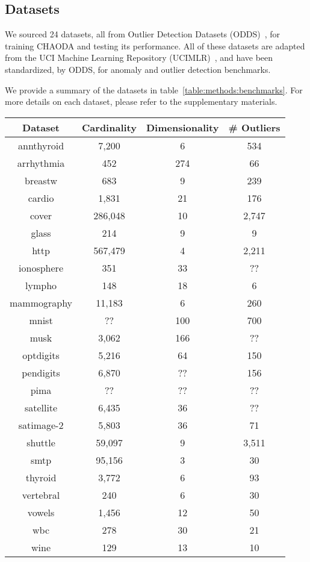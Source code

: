 \subsection{Datasets}\label{subsec:methods:datasets}

We sourced 24 datasets, all from Outlier Detection Datasets (ODDS)~\cite{rayana2016odds}, for training CHAODA and testing its performance.
All of these datasets are adapted from the UCI Machine Learning Repository (UCIMLR)~\cite{UCIMLR}, and have been standardized, by ODDS, for anomaly and outlier detection benchmarks.

We provide a summary of the datasets in table~\ref{table:methods:benchmarks}.
For more details on each dataset, please refer to the supplementary materials.

\begin{table*}[!t]
\renewcommand{\arraystretch}{1.25}
\caption{Datasets used for Benchmarks}
\label{table:methods:benchmarks}
\centering
\begin{tabular}{|c|c|c|c|}
\hline
\textbf{Dataset} & \textbf{Cardinality} & \textbf{Dimensionality} & \textbf{\# Outliers} \\
\hline
annthyroid & 7,200 & 6 & 534 \\
\hline
arrhythmia & 452 & 274 & 66 \\
\hline
breastw & 683 & 9 & 239 \\
\hline
cardio & 1,831 & 21 & 176 \\
\hline
cover & 286,048 & 10 & 2,747 \\
\hline
glass & 214 & 9 & 9 \\
\hline
http & 567,479 & 4 & 2,211 \\
\hline
ionosphere & 351 & 33 & ?? \\
\hline
lympho & 148 & 18 & 6 \\
\hline
mammography & 11,183 & 6 & 260 \\
\hline
mnist & ?? & 100 & 700 \\
\hline
musk & 3,062 & 166 & ?? \\
\hline
optdigits & 5,216 & 64 & 150 \\
\hline
pendigits & 6,870 & ?? & 156 \\
\hline
pima & ?? & ?? & ?? \\
\hline
satellite & 6,435 & 36 & ?? \\
\hline
satimage-2 & 5,803 & 36 & 71 \\
\hline
shuttle & 59,097 & 9 & 3,511 \\
\hline
smtp & 95,156 & 3 & 30 \\
\hline
thyroid & 3,772 & 6 & 93 \\
\hline
vertebral & 240 & 6 & 30 \\
\hline
vowels & 1,456 & 12 & 50 \\
\hline
wbc & 278 & 30 & 21 \\
\hline
wine & 129 & 13 & 10 \\
\hline
\end{tabular}
\end{table*}

